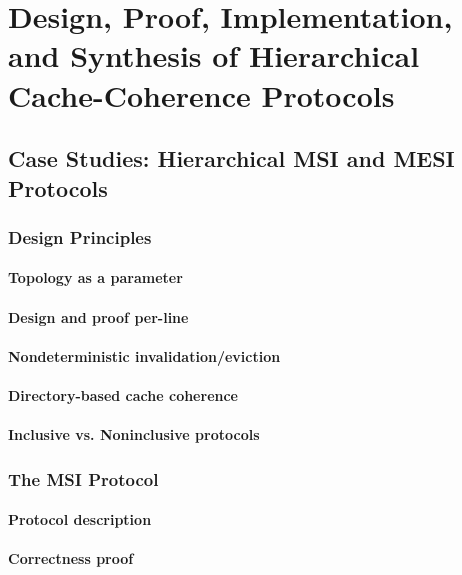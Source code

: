 \part{Design, Proof, Implementation, and Synthesis of Hierarchical Cache-Coherence Protocols}

\chapter{Case Studies: Hierarchical MSI and MESI Protocols}
\label{sec-case-study}

\section{Design Principles}

\subsection{Topology as a parameter}

\subsection{Design and proof per-line}

\subsection{Nondeterministic invalidation/eviction}

\subsection{Directory-based cache coherence}

\subsection{Inclusive vs. Noninclusive protocols}

\section{The MSI Protocol}
\label{sec-msi-protocol}

\subsection{Protocol description}

\subsection{Correctness proof}
\label{sec-msi-proof}

